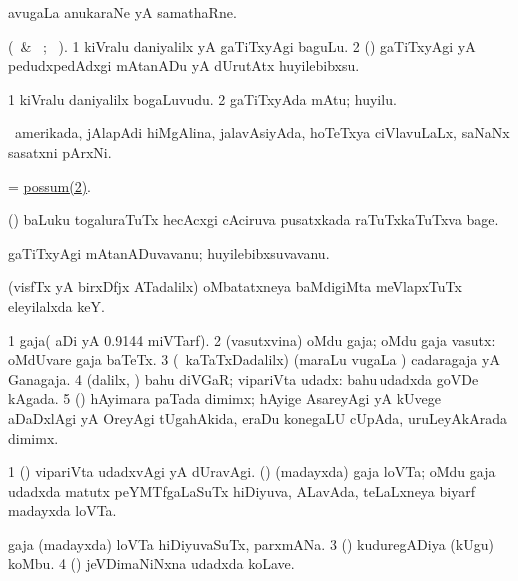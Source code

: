  avugaLa anukaraNe yA samathaRne.
\eanum
\emng
\eentry

\bentry
{} 
\gl{\akirx} 
\bmng
(\BU\ \& \BUkaq\ ; \vakaq\ ). 
\bnum
\num{1} kiVralu daniyalilx yA gaTiTxyAgi baguLu. 
\num{2} (\AmA) gaTiTxyAgi yA pedudxpedAdxgi mAtanADu yA dUrutAtx huyilebibxsu.
\enum
\emng
\eentry

\bentry
{} 
\gl{\nA}
\bmng
\bnum
\num{1} kiVralu daniyalilx bogaLuvudu. 
\num{2} gaTiTxyAda mAtu; huyilu.
\enum
\emng
\eentry

\bentry
{} 
\gl{\nA} 
\bmng
\da\ amerikada, jAlapAdi hiMgAlina, jalavAsiyAda, hoTeTxya ciVlavuLaLx, saNaNx sasatxni pArxNi.
\emng
\eentry

\bentry 
{} 
\gl{\nA}
\bmng
= \hyperref{kandict_p.pdf}{P}{possum(2)}{possum(2)}.
\emng 
\eentry

\bentry
{} 
\gl{\nA} 
\bmng
(\birx) baLuku togaluraTuTx hecAcxgi cAciruva pusatxkada raTuTxkaTuTxva bage.
\emng
\eentry

\bentry
{} 
\gl{\nA} 
\bmng
gaTiTxyAgi mAtanADuvavanu; huyilebibxsuvavanu.
\emng
\eentry

\bentry
{} 
\gl{\nA} 
\bmng
(visfTx  yA birxDfjx ATadalilx) oMbatatxneya baMdigiMta meVlapxTuTx eleyilalxda keY.
\emng
\eentry

\bentry
{} 
\gl{\nA} 
\bmng
\bnum
\num{1} gaja( aDi yA 0.9144 miVTarf).
\num{2} (vasutxvina) oMdu gaja; oMdu gaja vasutx:  oMdUvare gaja baTeTx. 
\num{3} (\kanmu\ kaTaTxDadalilx) (maraLu \mo vugaLa \vi) cadaragaja yA Ganagaja.
\num{4} (\bava dalilx, \AmA) bahu diVGaR; vipariVta udadx:   bahu\,udadxda goVDe kAgada. 
\num{5} (\nw) hAyimara paTada dimimx; hAyige AsareyAgi yA kUvege aDaDxlAgi yA OreyAgi tUgahAkida, eraDu konegaLU cUpAda, uruLeyAkArada dimimx.
\enum
\emng

\noindent
\gl{\pagu}
\bmng
\bnum
\num{1}  (\rUpa) vipariVta udadxvAgi yA dUravAgi. 
  (\birx) 
\banum
{}  (madayxda) gaja loVTa; oMdu gaja udadxda matutx  peYMTfgaLaSuTx hiDiyuva, ALavAda, teLaLxneya biyarf madayxda loVTa.

 gaja (madayxda) loVTa hiDiyuvaSuTx, parxmANa. 
\eanum
\numie
\num{3}  (\birx) kuduregADiya (kUgu) koMbu. 
\num{4}  (\birx) jeVDimaNiNxna udadxda koLave.
\enum
\emng
\eentry

